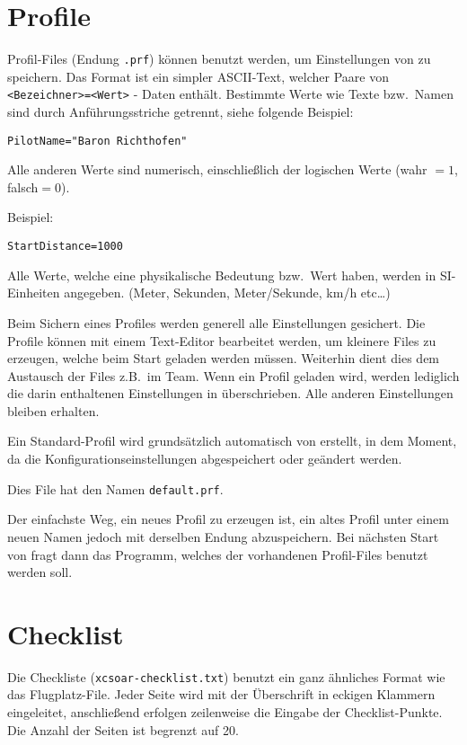 \section{Profile}
Profil-Files (Endung \verb|.prf|) können benutzt werden, um Einstellungen von \xc zu speichern.
Das Format ist ein simpler ASCII-Text, welcher Paare von  \verb|<Bezeichner>=<Wert>|  - Daten enthält.
Bestimmte Werte wie Texte bzw.\ Namen sind durch Anführungsstriche getrennt, siehe folgende Beispiel:

\begin{verbatim}
PilotName="Baron Richthofen"
\end{verbatim}

Alle anderen Werte sind numerisch, einschließlich der logischen Werte (wahr $=1$, falsch$=0$).

Beispiel:


\begin{verbatim}
StartDistance=1000
\end{verbatim}

Alle Werte, welche eine physikalische Bedeutung bzw.\ Wert haben, werden in \textsf{SI}-Einheiten angegeben.
(Meter, Sekunden, Meter/Sekunde, km/h etc\dots)

Beim Sichern eines Profiles werden generell alle Einstellungen gesichert.
Die Profile können mit einem Text-Editor bearbeitet werden, um kleinere Files zu erzeugen,
welche beim Start geladen werden müssen. Weiterhin dient dies dem Austausch der Files
z.B.\ im Team. Wenn ein Profil geladen wird, werden lediglich die darin enthaltenen
Einstellungen in \xc überschrieben. Alle anderen Einstellungen bleiben erhalten.

Ein Standard-Profil wird grundsätzlich automatisch von  \xc erstellt, in dem Moment, da
die Konfigurationseinstellungen abgespeichert oder geändert werden.

Dies File hat den Namen  \verb|default.prf|.

Der einfachste Weg, ein neues Profil zu erzeugen ist, ein altes Profil unter einem neuen
Namen jedoch mit derselben Endung abzuspeichern. Bei nächsten Start von \xc  fragt dann das Programm, welches der vorhandenen Profil-Files benutzt werden soll.


\section{Checklist}\label{sec:checklist-file}

Die Checkliste  (\verb|xcsoar-checklist.txt|) benutzt ein ganz ähnliches Format
wie das Flugplatz-File. 
Jeder Seite wird mit der Überschrift in eckigen Klammern eingeleitet, anschließend erfolgen
zeilenweise die Eingabe der Checklist-Punkte. Die Anzahl der Seiten ist begrenzt auf 20.

